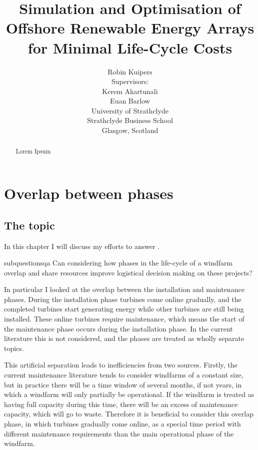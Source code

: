 \documentclass[a4paper,12pt]{report}
\begin{document}
\title{Simulation and Optimisation of Offshore Renewable Energy Arrays for Minimal Life-Cycle Costs}
\author{Robin Kuipers \\[1cm] Supervisors: \\ Kerem Akartunali \\ Euan Barlow\\[2cm] University of Strathclyde \\ Strathclyde Business School \\ {\small Glasgow, Scotland}}

\maketitle

\pagebreak

\begin{abstract}
Lorem Ipsum %
\end{abstract}

\pagebreak

\tableofcontents

\pagebreak

\chapter{Overlap between phases}
\section{The topic}
In this chapter I will discuss my efforts to answer . 

\begin{restatable}{subquestion}{sqa}
\label{sqa}
Can considering how phases in the life-cycle of a windfarm overlap and share resources improve logistical decision making on these projects?
\end{restatable}

In particular I looked at the overlap between the installation and maintenance phases. During the installation phase turbines come online gradually, and the completed turbines start generating energy while other turbines are still being installed. These online turbines require maintenance, which means the start of the maintenance phase occurs during the installation phase. In the current literature this is not considered, and the phases are treated as wholly separate topics. 

This artificial separation leads to inefficiencies from two sources. Firstly, the current maintenance literature tends to consider windfarms of a constant size, but in practice there will be a time window of several months, if not years, in which a windfarm will only partially be operational. If the windfarm is treated as having full capacity during this time, there will be an excess of maintenance capacity, which will go to waste. Therefore it is beneficial to consider this overlap phase, in which turbines gradually come online, as a special time period with different maintenance requirements than the main operational phase of the windfarm. 
\end{document}
